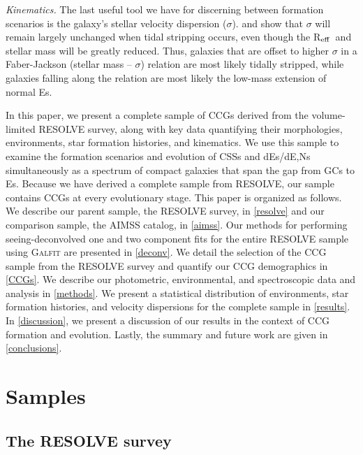 \documentclass[iop,apj]{emulateapj}
\newcommand{\Reff}{R$_{\rm eff}$}
\begin{document}
\textit{Kinematics.}  The last useful tool we have for discerning between formation scenarios is the galaxy's stellar velocity dispersion ($\sigma$). \citet{Bender1992} and \citet{Bekki2003} show that $\sigma$ will remain largely unchanged when tidal stripping occurs, even though the \Reff\ and stellar mass will be greatly reduced. Thus, galaxies that are offset to higher $\sigma$ in a Faber-Jackson (stellar mass -- $\sigma$) relation \citep{faber1976} are most likely tidally stripped, while galaxies falling along the relation are most likely the low-mass extension of normal Es.

In this paper, we present a complete sample of CCGs derived from the volume-limited RESOLVE survey, along with key data quantifying their morphologies, environments, star formation histories, and kinematics. We use this sample to examine the formation scenarios and evolution of CSSs and dEs/dE,Ns simultaneously as a spectrum of compact galaxies that span the gap from GCs to Es. Because we have derived a complete sample from RESOLVE, our sample contains CCGs at every evolutionary stage. This paper is organized as follows. We describe our parent sample, the RESOLVE survey, in \autoref{resolve} and our comparison sample, the AIMSS catalog, in \autoref{aimss}. Our methods for performing seeing-deconvolved one and two component fits for the entire RESOLVE sample using \textsc{Galfit} are presented in \autoref{deconv}. We detail the selection of the CCG sample from the RESOLVE survey and quantify our CCG demographics in \autoref{CCGs}. We describe our photometric, environmental, and spectroscopic data and analysis in \autoref{methods}. We present a statistical distribution of environments, star formation histories, and velocity dispersions for the complete sample in \autoref{results}. In \autoref{discussion}, we present a discussion of our results in the context of CCG formation and evolution. Lastly, the summary and future work are given in \autoref{conclusions}.

\section{Samples}
\label{samples}

\subsection{The RESOLVE survey}
\label{resolve}
\end{document}
